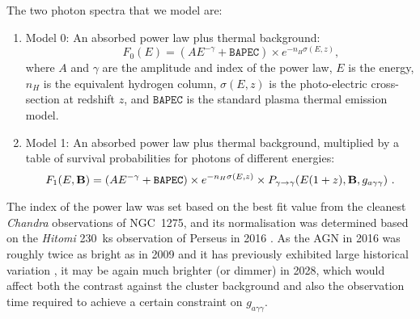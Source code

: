 \documentclass[fleqn,usenatbib,useAMS]{mnras}
\begin{document}
The two photon spectra that we model are:
\begin{enumerate}
\item Model 0: An absorbed power law plus thermal background:
\begin{equation}
\qquad F_{0}(E) = (A E^ {- \gamma} + \mathtt{BAPEC}) \times e^{-n_{H} \sigma(E,z)},
\end{equation}
where $A$ and $\gamma$ are the amplitude and index of the power law, $E$ is the energy, $n_H$ is the equivalent hydrogen column, $\sigma(E, z)$ is the photo-electric cross-section at redshift $z$, and $\mathtt{BAPEC}$ is the standard plasma thermal emission model.
\item Model 1: An absorbed power law plus thermal background, multiplied by a table of survival probabilities for photons of different energies:
\begin{equation}
F_{1}(E, {\bf B}) = (A E^ {- \gamma} + \mathtt{BAPEC}) \times e^{-n_{H} \sigma(E,z)} \times P_{\gamma \to \gamma} (E (1 + z), { \bf B}, g_{a \gamma \gamma})~.
\end{equation}
\end{enumerate}
The index of the power law was set based on the best fit value from the cleanest {\it Chandra} observations of NGC~1275, and its normalisation was determined based on the {\it Hitomi} 230~ks observation of Perseus in 2016 \citep{Aharonian:2016gzq}. As the AGN in 2016 was
roughly twice as bright as in 2009 and it has previously exhibited large historical variation \citep{Fabian:2015kua}, it may be again much brighter (or dimmer) in 2028, which would affect both the contrast
against the cluster background and also the observation time required to achieve a certain constraint on $g_{a \gamma \gamma}$.
\end{document}
